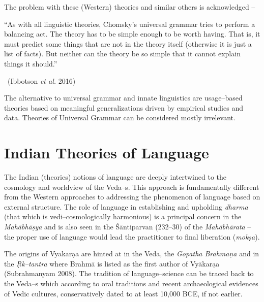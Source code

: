 The problem with these (Western) theories and similar others is acknowledged –

\begin{myquote}
“As with all linguistic theories, Chomsky’s universal grammar tries to perform a balancing act. The theory has to be simple enough to be worth having. That is, it must predict some things that are not in the theory itself (otherwise it is just a list of facts). But neither can the theory be so simple that it cannot explain things it should.”

~\hfill (Ibbotson \textit{et al.} 2016)
\end{myquote}

The alternative to universal grammar and innate linguistics are usage–based theories based on meaningful generalizations driven by empirical studies and data. Theories of Universal Grammar can be considered mostly irrelevant. 

\vskip -26pt


\section*{Indian Theories of Language}

\vskip -6pt

The Indian (theories) notions of language are deeply intertwined to the cosmology and worldview of the Veda–s. This approach is fundamentally different from the Western approaches to addressing the phenomenon of language based on external structure. The role of language in establishing and upholding \textit{dharma} (that which is vedi–cosmologically harmonious) is a principal concern in the \textit{Mahābhāṣya} and is also seen in the Śāntiparvan (232–30) of the \textit{Mahābhārata} – the proper use of language would lead the practitioner to final liberation (\textit{mokṣa}).

The origins of Vyākarạa are hinted at in the Veda, the \textit{Gopatha Brāhmaṇa} and in the \textit{Ṛk–tantra} where Brahmā is listed as the first author of Vyākarạa (Subrahmanyam 2008). The tradition of language–science can be traced back to the Veda–s which according to oral traditions and recent archaeological evidences of Vedic cultures, conservatively dated to at least 10,000 BCE, if not earlier.

